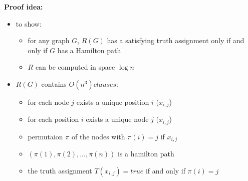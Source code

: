\documentclass[a4]{scrartcl}
\begin{document}
\textbf{Proof idea:}

\begin{itemize}
\item to show:
\begin{itemize}
\item for any graph $G$, $R(G)$ has a satisfying truth assignment only if and only if $G$ has a Hamilton path
\item $R$ can be computed in space $\log n$
\end{itemize}

\item $R(G)$ contains $O(n^3) clauses$:
\begin{itemize}
\item for each node $j$ exists a unique position $i$ ($x_{i,j}$)
\item for each position $i$ exists a unique node $j$ ($x_{i,j}$)
\item permutaion $\pi$ of the nodes with $\pi(i)=j$ if $x_{i,j}$
\item $(\pi(1),\pi(2),...,\pi(n))$ is a hamilton path
\item the truth assignment $T(x_{i, j}) = true$ if and only if $\pi(i) = j$
\end{itemize}

\end{itemize}








\end{document}

